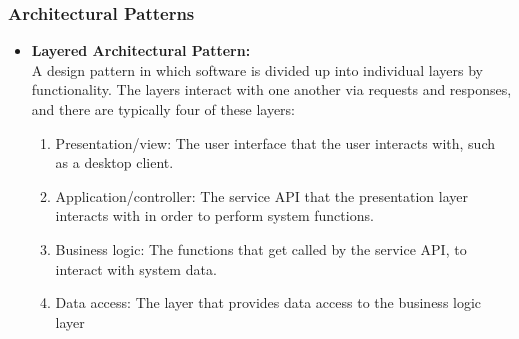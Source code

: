 \documentclass[a4paper,10pt]{article}
\begin{document}
\subsubsection{Architectural Patterns}
	\begin{itemize}
		\item \textbf{Layered Architectural Pattern:}\\
		A design pattern in which software is divided up into individual layers by functionality. The layers interact with one another via requests and responses, and there are typically four of these layers:
		\begin{enumerate}
			\item Presentation/view: The user interface that the user interacts with, such as a desktop client.
			\item Application/controller: The service API that the presentation layer interacts with in order to perform system functions.
			\item Business logic: The functions that get called by the service API, to interact with system data.
			\item Data access: The layer that provides data access to the business logic layer 
		\end{enumerate}
		

\end{itemize}
\end{document}
